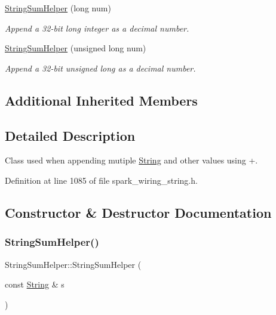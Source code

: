 \begin{DoxyCompactItemize}
\hyperlink{class_string_sum_helper_a6fefb0b3145abdc5632134a41770eaf7}{String\+Sum\+Helper} (long num)
\begin{DoxyCompactList}\small\item\em Append a 32-\/bit long integer as a decimal number. \end{DoxyCompactList}\item 
\hyperlink{class_string_sum_helper_ad05bd49f0b730d78d0a5dcf1b8c512eb}{String\+Sum\+Helper} (unsigned long num)
\begin{DoxyCompactList}\small\item\em Append a 32-\/bit unsigned long as a decimal number. \end{DoxyCompactList}\end{DoxyCompactItemize}
\subsection*{Additional Inherited Members}


\subsection{Detailed Description}
Class used when appending mutiple \hyperlink{class_string}{String} and other values using +. 

Definition at line 1085 of file spark\+\_\+wiring\+\_\+string.\+h.



\subsection{Constructor \& Destructor Documentation}
\mbox{\label{class_string_sum_helper_ae7676b662b830bbc8731f8b72f9413bb}} 
\subsubsection{\texorpdfstring{String\+Sum\+Helper()}{StringSumHelper()}\hspace{0.1cm}{\footnotesize\ttfamily [1/8]}}
{\footnotesize\ttfamily String\+Sum\+Helper\+::\+String\+Sum\+Helper (\begin{DoxyParamCaption}\item[{const \hyperlink{class_string}{String} \&}]{s }\end{DoxyParamCaption})\hspace{0.3cm}{\ttfamily [inline]}}



